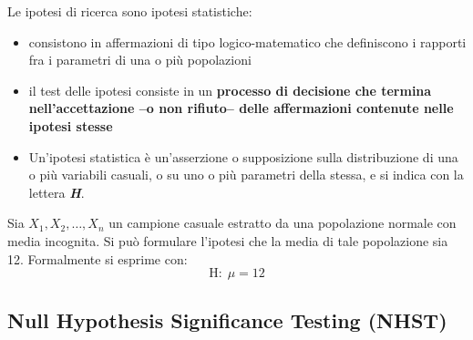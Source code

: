 \documentclass[
  ignorenonframetext,
  compress, aspectratio=149]{beamer}
\providecommand{\tightlist}{%
  \setlength{\itemsep}{0pt}\setlength{\parskip}{0pt}}
\begin{document}
\begin{frame}{}
\label{section-12}
\small

Le ipotesi di ricerca sono ipotesi statistiche:

\begin{itemize}
\tightlist
\item
  consistono in affermazioni di tipo logico-matematico che definiscono i
  rapporti fra i parametri di una o più popolazioni
\item
  il test delle ipotesi consiste in un \textbf{processo di decisione che
  termina nell'accettazione --o non rifiuto-- delle affermazioni
  contenute nelle ipotesi stesse}
\item
  Un'ipotesi statistica è un'asserzione o supposizione sulla
  distribuzione di una o più variabili casuali, o su uno o più parametri
  della stessa, e si indica con la lettera \textbf{\emph{H}}.
\end{itemize}

\begin{tcolorbox}[enhanced jigsaw, opacityback=0, arc=.35mm, opacitybacktitle=0.6, rightrule=.15mm, breakable, titlerule=0mm, leftrule=.75mm, title={Esempio}, toprule=.15mm, toptitle=1mm, coltitle=black, bottomrule=.15mm, bottomtitle=1mm, left=2mm, colframe=quarto-callout-note-color-frame, colback=white, colbacktitle=quarto-callout-note-color!10!white]

Sia \(X_1, X_2, \ldots, X_n\) un campione casuale estratto da una
popolazione normale con media incognita. Si può formulare l'ipotesi che
la media di tale popolazione sia 12. Formalmente si esprime con:
\[\text{H}:\; \mu = 12\]

\end{tcolorbox}
\end{frame}

\subsection{Null Hypothesis Significance Testing
(NHST)}\label{null-hypothesis-significance-testing-nhst}
\end{document}

